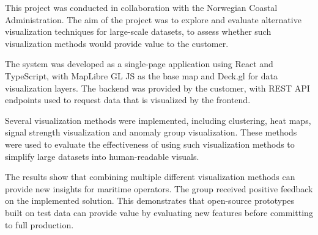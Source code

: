 
This project was conducted in collaboration with the Norwegian Coastal Administration. The aim of the project was to explore and evaluate alternative visualization techniques for large-scale datasets, to assess whether such visualization methods would provide value to the customer. 

The system was developed as a single-page application using React and TypeScript, with MapLibre GL JS as the base map and Deck.gl for data visualization layers. The backend was provided by the customer, with REST API endpoints used to request data that is visualized by the frontend.

Several visualization methods were implemented, including clustering, heat maps, signal strength visualization and anomaly group visualization. These methods were used to evaluate the effectiveness of using such visualization methods to simplify large datasets into human-readable visuals.

The results show that combining multiple different visualization methods can provide new insights for maritime operators. The group received positive feedback on the implemented solution. This demonstrates that open-source prototypes built on test data can provide value by evaluating new features before committing to full production. 